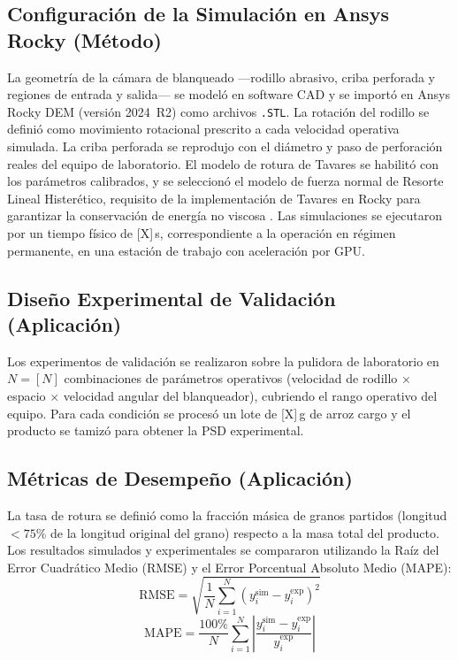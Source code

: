 \documentclass[conference]{IEEEtran}
\begin{document}
\subsection{Configuración de la Simulación en Ansys Rocky (Método)}
La geometría de la cámara de blanqueado —rodillo abrasivo, criba perforada y regiones de entrada y salida— se modeló en software CAD y se importó en Ansys Rocky DEM (versión 2024~R2) como archivos \texttt{.STL}. La rotación del rodillo se definió como movimiento rotacional prescrito a cada velocidad operativa simulada. La criba perforada se reprodujo con el diámetro y paso de perforación reales del equipo de laboratorio. El modelo de rotura de Tavares se habilitó con los parámetros calibrados, y se seleccionó el modelo de fuerza normal de Resorte Lineal Histerético, requisito de la implementación de Tavares en Rocky para garantizar la conservación de energía no viscosa \cite{rocky2024}. Las simulaciones se ejecutaron por un tiempo físico de [X]\,s, correspondiente a la operación en régimen permanente, en una estación de trabajo con aceleración por GPU.

\subsection{Diseño Experimental de Validación (Aplicación)}
Los experimentos de validación se realizaron sobre la pulidora de laboratorio en $N=[N]$ combinaciones de parámetros operativos (velocidad de rodillo $\times$ espacio $\times$ velocidad angular del blanqueador), cubriendo el rango operativo del equipo. Para cada condición se procesó un lote de [X]\,g de arroz cargo y el producto se tamizó para obtener la PSD experimental.

\subsection{Métricas de Desempeño (Aplicación)}
La tasa de rotura se definió como la fracción másica de granos partidos (longitud $<75\%$ de la longitud original del grano) respecto a la masa total del producto. Los resultados simulados y experimentales se compararon utilizando la Raíz del Error Cuadrático Medio (RMSE) y el Error Porcentual Absoluto Medio (MAPE):
\begin{equation}
\mathrm{RMSE} = \sqrt{\frac{1}{N}\sum_{i=1}^{N}\left(y_{i}^{\mathrm{sim}}-y_{i}^{\mathrm{exp}}\right)^{2}}
\label{eq:rmse}
\end{equation}
\begin{equation}
\mathrm{MAPE} = \frac{100\%}{N}\sum_{i=1}^{N}\left|\frac{y_{i}^{\mathrm{sim}}-y_{i}^{\mathrm{exp}}}{y_{i}^{\mathrm{exp}}}\right|
\label{eq:mape}
\end{equation}
\end{document}

